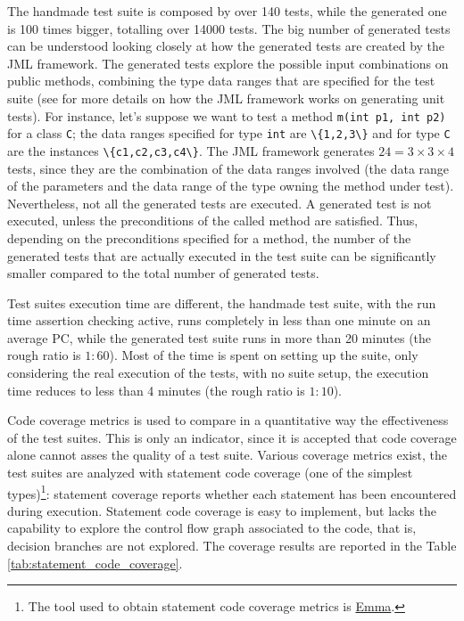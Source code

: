\documentclass[english]{lni}
\newcommand{\myhref}[2]{\ifpdf\href{#1}{#2}\else\htmladdnormallinkfoot{#2}{#1}\fi}
\newcommand{\lil}[1]{\texttt{\lstinline|#1|}}
\begin{document}
The handmade test suite is composed by over 140 tests, while the generated one is 100 times bigger, totalling over 14000 tests.
The big number of generated tests can be understood looking closely at how the generated tests are created by the JML framework. 
The generated tests explore the possible input combinations on public methods, combining the type data ranges that are specified for the test suite (see \cite{Cheon-Leavens02} for more details on how the JML framework works on generating unit tests). 
For instance, let's suppose we want to test a method \lil{m(int p1, int p2)} for a class \lil{C}; the data ranges specified for type \lil{int} are \lil{\{1,2,3\}} and for type \lil{C} are the instances \lil{\{c1,c2,c3,c4\}}. 
The JML framework generates $24 = 3 \times 3 \times 4$ tests, since they are the combination of the data ranges involved (the data range of the parameters and the data range of the type owning the method under test). 
Nevertheless, not all the generated tests are executed.
A generated test is not executed, unless the preconditions of the called method are satisfied. 
Thus, depending on the preconditions specified for a method, the number of the generated tests that are actually executed in the test suite can be significantly smaller compared to the total number of generated tests.

Test suites execution time are different, the handmade test suite, with the run time assertion checking active, runs completely in less than one minute on an average PC, while the generated test suite runs in more than 20 minutes (the rough ratio is $ 1 : 60 $). 
Most of the time is spent on setting up the suite, only considering the real execution of the tests, with no suite setup, the execution time reduces to less than 4 minutes (the rough ratio is $ 1 : 10 $).

Code coverage metrics is used to compare in a quantitative way the effectiveness of the test suites. 
This is only an indicator, since it is accepted that code coverage alone cannot asses the quality of a test suite\cite{Marick1999,Chockler2006}.
Various coverage metrics exist, the test suites are analyzed with statement code coverage (one of the simplest types)\footnote{The tool used to obtain statement code coverage metrics is \myhref{http://emma.sourceforge.net/}{Emma}.}: statement coverage reports whether each statement has been encountered during execution. 
Statement code coverage is easy to implement, but lacks the capability to explore the control flow graph associated to the code, that is,
decision branches are not explored. 
The coverage results are reported in the Table \ref{tab:statement_code_coverage}.
\end{document}
